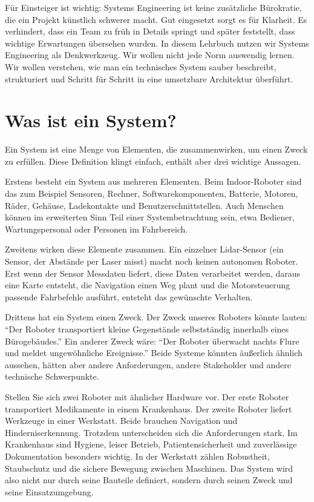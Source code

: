 Für Einsteiger ist wichtig: Systems Engineering ist keine zusätzliche Bürokratie, die ein Projekt künstlich schwerer macht. Gut eingesetzt sorgt es für Klarheit. Es verhindert, dass ein Team zu früh in Details springt und später feststellt, dass wichtige Erwartungen übersehen wurden. In diesem Lehrbuch nutzen wir Systems Engineering als Denkwerkzeug. Wir wollen nicht jede Norm auswendig lernen. Wir wollen verstehen, wie man ein technisches System sauber beschreibt, strukturiert und Schritt für Schritt in eine umsetzbare Architektur überführt.

\section{Was ist ein System?}
Ein System ist eine Menge von Elementen, die zusammenwirken, um einen Zweck zu erfüllen. Diese Definition klingt einfach, enthält aber drei wichtige Aussagen.

Erstens besteht ein System aus mehreren Elementen. Beim Indoor-Roboter sind das zum Beispiel Sensoren, Rechner, Softwarekomponenten, Batterie, Motoren, Räder, Gehäuse, Ladekontakte und Benutzerschnittstellen. Auch Menschen können im erweiterten Sinn Teil einer Systembetrachtung sein, etwa Bediener, Wartungspersonal oder Personen im Fahrbereich.

Zweitens wirken diese Elemente zusammen. Ein einzelner Lidar-Sensor (ein Sensor, der Abstände per Laser misst) macht noch keinen autonomen Roboter. Erst wenn der Sensor Messdaten liefert, diese Daten verarbeitet werden, daraus eine Karte entsteht, die Navigation einen Weg plant und die Motorsteuerung passende Fahrbefehle ausführt, entsteht das gewünschte Verhalten.

Drittens hat ein System einen Zweck. Der Zweck unseres Roboters könnte lauten: \enquote{Der Roboter transportiert kleine Gegenstände selbstständig innerhalb eines Bürogebäudes.} Ein anderer Zweck wäre: \enquote{Der Roboter überwacht nachts Flure und meldet ungewöhnliche Ereignisse.} Beide Systeme könnten äußerlich ähnlich aussehen, hätten aber andere Anforderungen, andere Stakeholder und andere technische Schwerpunkte.

\begin{praxisbox}
Stellen Sie sich zwei Roboter mit ähnlicher Hardware vor. Der erste Roboter transportiert Medikamente in einem Krankenhaus. Der zweite Roboter liefert Werkzeuge in einer Werkstatt. Beide brauchen Navigation und Hinderniserkennung. Trotzdem unterscheiden sich die Anforderungen stark. Im Krankenhaus sind Hygiene, leiser Betrieb, Patientensicherheit und zuverlässige Dokumentation besonders wichtig. In der Werkstatt zählen Robustheit, Staubschutz und die sichere Bewegung zwischen Maschinen. Das System wird also nicht nur durch seine Bauteile definiert, sondern durch seinen Zweck und seine Einsatzumgebung.
\end{praxisbox}


